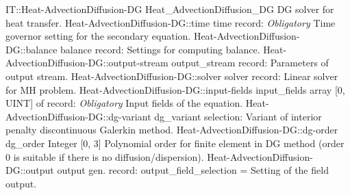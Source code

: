 \begin{RecordType}
	{IT::Heat-AdvectionDiffusion-DG}
	{Heat{\_}AdvectionDiffusion{\_}DG}
	{}%
	{}%
	{{{DG solver for heat transfer.}%
}}
		\RecKey
			{Heat-AdvectionDiffusion-DG::time}
			{time}
			{{record: }}{}
			{ \it{Obligatory}}
			{{{Time governor setting for the secondary equation.}%
}}
		\RecKey
			{Heat-AdvectionDiffusion-DG::balance}
			{balance}
			{{record: }}{}
			{ \ValueDefault{{\{}{\}}}}
			{{{Settings for computing balance.}%
}}
		\RecKey
			{Heat-AdvectionDiffusion-DG::output-stream}
			{output{\_}stream}
			{{record: }}{}
			{ \ValueDefault{{\{}{\}}}}
			{{{Parameters of output stream.}%
}}
		\RecKey
			{Heat-AdvectionDiffusion-DG::solver}
			{solver}
			{{record: }}{}
			{ \ValueDefault{{\{}{\}}}}
			{{{Linear solver for MH problem.}%
}}
		\RecKey
			{Heat-AdvectionDiffusion-DG::input-fields}
			{input{\_}fields}
			{{array [0, UINT] of }{record: }}{}
			{ \it{Obligatory}}
			{{{Input fields of the equation.}%
}}
		\RecKey
			{Heat-AdvectionDiffusion-DG::dg-variant}
			{dg{\_}variant}
			{{selection: }}{}
			{ }
			{{{Variant of interior penalty discontinuous Galerkin method.}%
}}
		\RecKey
			{Heat-AdvectionDiffusion-DG::dg-order}
			{dg{\_}order}
			{{Integer [0, 3]}}{}
			{ }
			{{{Polynomial order for finite element in DG method (order 0 is suitable if there is no diffusion/dispersion).}%
}}
		\RecKey
			{Heat-AdvectionDiffusion-DG::output}
			{output}
			{{gen. record: }}{{output{\_}field{\_}selection}{ = }}
			{ }
			{{{Setting of the field output.}%
}}
\end{RecordType}
